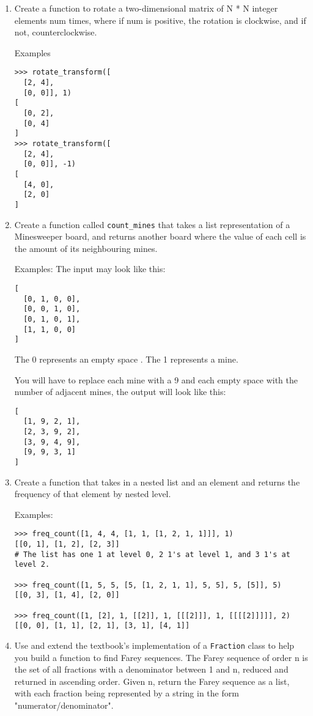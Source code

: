 \documentclass{article}
\newcommand{\li}{\item}
\begin{document}
\begin{enumerate}
\li Create a function to rotate a two-dimensional matrix of N * N integer elements num times, 
where if num is positive, the rotation is clockwise, and if not, counterclockwise.

Examples
\begin{lstlisting}
>>> rotate_transform([
  [2, 4],
  [0, 0]], 1) 
[
  [0, 2],
  [0, 4]
]
>>> rotate_transform([
  [2, 4],
  [0, 0]], -1)
[
  [4, 0],
  [2, 0]
]
\end{lstlisting}

\li
Create a function called \lstinline{count_mines}
 that takes a list representation of a Minesweeper board, 
 and returns another board where the value of each cell is 
 the amount of its neighbouring mines.

Examples:
The input may look like this:
\begin{lstlisting}
[
  [0, 1, 0, 0],
  [0, 0, 1, 0],
  [0, 1, 0, 1],
  [1, 1, 0, 0]
]
\end{lstlisting}
The 0 represents an empty space . The 1 represents a mine.

You will have to replace each mine with a 9 and each empty space with the number of adjacent mines, the output will look like this:
\begin{lstlisting}
[
  [1, 9, 2, 1],
  [2, 3, 9, 2],
  [3, 9, 4, 9],
  [9, 9, 3, 1]
]
\end{lstlisting}

\li
Create a function that takes in a nested list and an element and returns the frequency of that element by nested level.

Examples:
\begin{lstlisting}
>>> freq_count([1, 4, 4, [1, 1, [1, 2, 1, 1]]], 1)
[[0, 1], [1, 2], [2, 3]]
# The list has one 1 at level 0, 2 1's at level 1, and 3 1's at level 2.

>>> freq_count([1, 5, 5, [5, [1, 2, 1, 1], 5, 5], 5, [5]], 5)
[[0, 3], [1, 4], [2, 0]]

>>> freq_count([1, [2], 1, [[2]], 1, [[[2]]], 1, [[[[2]]]]], 2)
[[0, 0], [1, 1], [2, 1], [3, 1], [4, 1]]
\end{lstlisting}

\li Use and extend the textbook's implementation of a \lstinline{Fraction} class to help you
build a function to find Farey sequences.
The Farey sequence of order n is the set of all fractions with a denominator between 1 and n, reduced and returned in ascending order. Given n, return the Farey sequence as a list, with each fraction being represented by a string in the form "numerator/denominator".


\end{enumerate}
\end{document}
